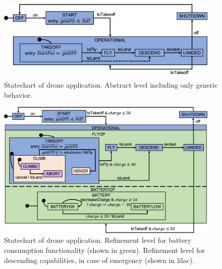 \begin{figure}[!h]
	\vspace{-.4cm}
	\centering
	\includegraphics[width=0.95\textwidth]{figures/Picture1.png}
	\caption{Statechart of drone application. Abstract level including only generic behavior. }
	\label{fig:drone1}
	\vspace{-.4cm}
\end{figure} 


\begin{figure}[!h]
	\centering
	\includegraphics[width=0.95\textwidth]{figures/Picture5.png}
	\caption{Statechart of drone application. 
	Refinement level for battery consumption functionality (shown in green).
	Refinement level for descending capabilities, in case of emergency (shown in lilac).}
	\label{fig:drone4}
\end{figure} 

